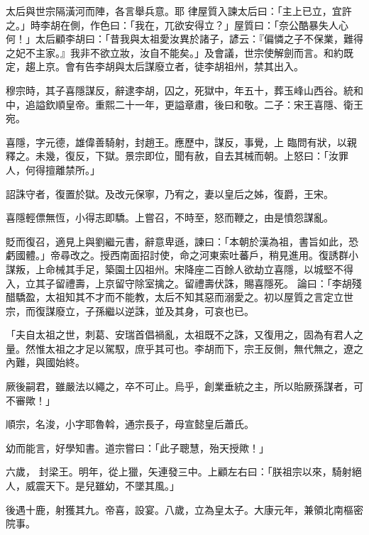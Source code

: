\begin{pinyinscope}
 太后與世宗隔潢河而陣，各言舉兵意。耶
 律屋質入諫太后曰：「主上已立，宜許之。」時李胡在側，作色曰：「我在，兀欲安得立？」屋質曰：「奈公酷暴失人心何！」太后顧李胡曰：「昔我與太祖愛汝異於諸子，諺云：『偏憐之子不保業，難得之妃不主家。』我非不欲立妝，汝自不能矣。」及會議，世宗使解劍而言。和約既定，趨上京。會有告李胡與太后謀廢立者，徒李胡祖州，禁其出入。



 穆宗時，其子喜隱謀反，辭逮李胡，囚之，死獄中，年五十，葬玉峰山西谷。統和中，追謚欽順皇帝。重熙二十一年，更謚章肅，後曰和敬。二子：宋王喜隱、衛王宛。



 喜隱，字元德，雄偉善騎射，封趙王。應歷中，謀反，事覺，上
 臨問有狀，以親釋之。未幾，復反，下獄。景宗即位，聞有赦，自去其械而朝。上怒曰：「汝罪人，何得擅離禁所。」



 詔誅守者，復置於獄。及改元保寧，乃宥之，妻以皇后之姊，復爵，王宋。



 喜隱輕僄無恆，小得志即驕。上嘗召，不時至，怒而鞭之，由是憤怨謀亂。



 貶而復召，適見上與劉繼元書，辭意卑遜，諫曰：「本朝於漢為祖，書旨如此，恐虧國體。」帝尋改之。授西南面招討使，命之河東索吐蕃戶，稍見進用。復誘群小謀叛，上命械其手足，築園土囚祖州。宋降座二百餘人欲劫立喜隱，以城堅不得入，立其子留禮壽，上京留守除室擒之。留禮壽伏誅，賜喜隱死。
 論曰：「李胡殘醋驕盈，太祖知其不才而不能教，太后不知其惡而溺愛之。初以屋質之言定立世宗，而復謀廢立，子孫繼以逆誅，並及其身，可哀也已。



 「夫自太祖之世，刺葛、安瑞首倡禍亂，太祖既不之誅，又復用之，固為有君人之量。然惟太祖之才足以駕馭，庶乎其可也。李胡而下，宗王反側，無代無之，遼之內難，與國始終。



 厥後嗣君，雖嚴法以繩之，卒不可止。烏乎，創業垂統之主，所以貽厥孫謀者，可不審歟！」



 順宗，名浚，小字耶魯斡，通宗長子，母宣懿皇后蕭氏。



 幼而能言，好學知書。道宗嘗曰：「此子聰慧，殆天授歟！」



 六歲，
 封梁王。明年，從上獵，矢連發三中。上顧左右曰：「朕祖宗以來，騎射絕人，威震天下。是兒雖幼，不墜其風。」



 後遇十鹿，射獲其九。帝喜，設宴。八歲，立為皇太子。大康元年，兼領北南樞密院事。




\end{pinyinscope}
